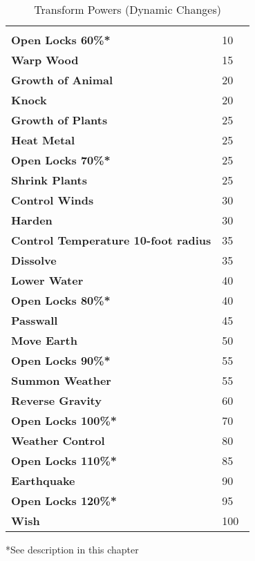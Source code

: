 \begin{multicols*}{2}
\begin {table}[H]
  \caption{Transform Powers (Dynamic Changes)}
  \begin{tabularx}{\columnwidth}{>{\bfseries}YY}
   & \\
	Open Locks 60\%* & 10\\
	Warp Wood & 15\\
	Growth of Animal & 20\\
	Knock & 20\\
	Growth of Plants & 25\\
	Heat Metal & 25\\
	Open Locks 70\%* & 25\\
	Shrink Plants & 25\\
	Control Winds & 30\\
	Harden & 30\\
	Control Temperature 10-foot radius & 35\\
	Dissolve & 35\\
	Lower Water & 40\\
	Open Locks 80\%* & 40\\
	Passwall & 45\\
	Move Earth & 50\\
	Open Locks 90\%* & 55\\
	Summon Weather & 55\\
	Reverse Gravity & 60\\
	Open Locks 100\%* & 70\\
	Weather Control & 80\\
	Open Locks 110\%* & 85\\
	Earthquake & 90\\
	Open Locks 120\%* & 95\\
	Wish & 100\
  \end {tabularx}
	*See description in this chapter
\end {table}


\end{multicols*}
